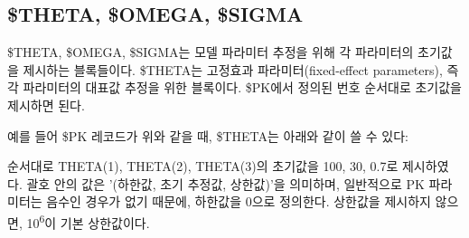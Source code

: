 \documentclass[
  10pt,
  krantz2,
  a4paper]{krantz}
\newenvironment{Shaded}{\begin{snugshade}}{\end{snugshade}}
\newcommand{\DecValTok}[1]{\textcolor[rgb]{0.00,0.00,0.81}{#1}}
\newcommand{\FloatTok}[1]{\textcolor[rgb]{0.00,0.00,0.81}{#1}}
\newcommand{\KeywordTok}[1]{\textcolor[rgb]{0.13,0.29,0.53}{\textbf{#1}}}
\newcommand{\NormalTok}[1]{#1}
\newcommand{\OperatorTok}[1]{\textcolor[rgb]{0.81,0.36,0.00}{\textbf{#1}}}
\newcommand{\StringTok}[1]{\textcolor[rgb]{0.31,0.60,0.02}{#1}}
\newenvironment{Shaded}{\begin{snugshade}}{\end{snugshade}}
\theoremstyle{definition}
\theoremstyle{definition}
\theoremstyle{definition}
\theoremstyle{remark}
\begin{document}
\hypertarget{theta-omega-sigma}{%
\subsection{\$THETA, \$OMEGA, \$SIGMA}\label{theta-omega-sigma}}

\$THETA, \$OMEGA, \$SIGMA는 모델 파라미터 추정을 위해 각 파라미터의 초기값을 제시하는 블록들이다. \$THETA는 고정효과 파라미터(fixed-effect parameters), 즉 각 파라미터의 대표값 추정을 위한 블록이다. \$PK에서 정의된 번호 순서대로 초기값을 제시하면 된다.

\begin{Shaded}
\end{Shaded}

예를 들어 \$PK 레코드가 위와 같을 때, \$THETA는 아래와 같이 쓸 수 있다:

\begin{Shaded}
\end{Shaded}

순서대로 THETA(1), THETA(2), THETA(3)의 초기값을 100, 30, 0.7로 제시하였다. 괄호 안의 값은 '(하한값, 초기 추정값, 상한값)'을 의미하며, 일반적으로 PK 파라미터는 음수인 경우가 없기 때문에, 하한값을 0으로 정의한다. 상한값을 제시하지 않으면, 10\textsuperscript{6}이 기본 상한값이다.
\end{document}
